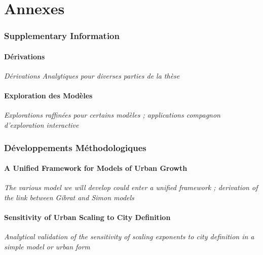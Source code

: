 \part*{Annexes}








\section{Supplementary Information}


\subsection{Dérivations}

\textit{Dérivations Analytiques pour diverses parties de la thèse}


\subsection{Exploration des Modèles}

\textit{Explorations raffinées pour certains modèles ; applications compagnon d'exploration interactive}


\section{Développements Méthodologiques}

\subsection{A Unified Framework for Models of Urban Growth}

\textit{The various model we will develop could enter a unified framework ; derivation of the link between Gibrat and Simon models}


\subsection{Sensitivity of Urban Scaling to City Definition}

\textit{Analytical validation of the sensitivity of scaling exponents to city definition in a simple model or urban form}

